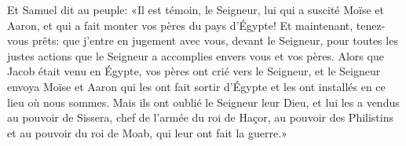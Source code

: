 Et Samuel dit au peuple:
	«Il est témoin, le Seigneur, lui qui a suscité Moïse et Aaron,
	et qui a fait monter vos pères du pays d’Égypte!
Et maintenant, tenez-vous prêts:
	que j’entre en jugement avec vous, devant le Seigneur,
	pour toutes les justes actions que le Seigneur a accomplies envers vous et vos pères.
Alors que Jacob était venu en Égypte, vos pères ont crié vers le Seigneur,
	et le Seigneur envoya Moïse et Aaron
	qui les ont fait sortir d’Égypte et les ont installés en ce lieu où nous sommes.
Mais ils ont oublié le Seigneur leur Dieu,
	et lui les a vendus au pouvoir de Sissera, chef de l’armée du roi de Haçor,
	au pouvoir des Philistins et au pouvoir du roi de Moab, qui leur ont fait la guerre.»
